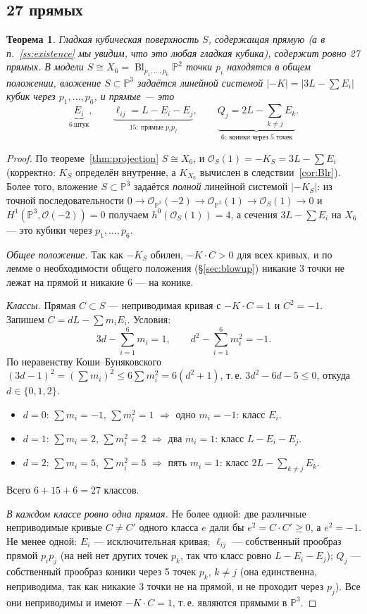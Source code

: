 \documentclass[11pt,a4paper]{article}
\theoremstyle{plain}
\newtheorem{theorem}{Теорема}[section]
\theoremstyle{definition}
\theoremstyle{remark}
\newcommand{\PP}{\mathbb{P}}
\newcommand{\cO}{\mathcal{O}}
\DeclareMathOperator{\Bl}{Bl}
\begin{document}
\subsection{27 прямых}

\begin{theorem}\label{thm:27}
Гладкая кубическая поверхность $S$, содержащая прямую (а в п.~\ref{ss:existence} мы увидим, что это любая гладкая
кубика), содержит ровно 27 прямых. В модели $S\cong X_6=\Bl_{p_1,\dots,p_6}\PP^2$ точки $p_i$ находятся в общем
положении, вложение $S\subset\PP^3$ задаётся линейной системой $|-K|=|3L-\sum E_i|$ кубик через $p_1,\dots,p_6$, и
прямые --- это
\[
\underbrace{E_i}_{6\ \text{штук}},\qquad
\underbrace{\ell_{ij}=L-E_i-E_j}_{15:\ \text{прямые } p_ip_j},\qquad
\underbrace{Q_j=2L-\textstyle\sum_{k\ne j}E_k}_{6:\ \text{коники через 5 точек}}.
\]
\end{theorem}
\begin{proof}
По теореме~\ref{thm:projection} $S\cong X_6$, и $\cO_S(1)=-K_S=3L-\sum E_i$ (корректно: $K_S$ определён
внутренне, а $K_{X_6}$ вычислен в следствии~\ref{cor:Blr}). Более того, вложение $S\subset\PP^3$ задаётся
\emph{полной} линейной системой $|-K_S|$: из точной последовательности $0\to\cO_{\PP^3}(-2)\to\cO_{\PP^3}(1)\to
\cO_S(1)\to0$ и $H^1(\PP^3,\cO(-2))=0$ получаем $h^0(\cO_S(1))=4$, а сечения $3L-\sum E_i$ на $X_6$ --- это
кубики через $p_1,\dots,p_6$.

\emph{Общее положение.} Так как $-K_S$ обилен, $-K\cdot C>0$ для всех кривых, и по лемме о необходимости общего
положения (\S\ref{sec:blowup}) никакие 3 точки не лежат на прямой и никакие 6 --- на конике.

\emph{Классы.} Прямая $C\subset S$ --- неприводимая кривая с $-K\cdot C=1$ и $C^2=-1$. Запишем
$C=dL-\sum m_iE_i$. Условия:
\[
3d-\sum_{i=1}^6m_i=1,\qquad d^2-\sum_{i=1}^6m_i^2=-1.
\]
По неравенству Коши--Буняковского $(3d-1)^2=(\sum m_i)^2\le6\sum m_i^2=6(d^2+1)$, т.\,е. $3d^2-6d-5\le0$,
откуда $d\in\{0,1,2\}$.
\begin{itemize}
\item $d=0$: $\sum m_i=-1$, $\sum m_i^2=1$ $\Rightarrow$ одно $m_i=-1$: класс $E_i$.
\item $d=1$: $\sum m_i=2$, $\sum m_i^2=2$ $\Rightarrow$ два $m_i=1$: класс $L-E_i-E_j$.
\item $d=2$: $\sum m_i=5$, $\sum m_i^2=5$ $\Rightarrow$ пять $m_i=1$: класс $2L-\sum_{k\ne j}E_k$.
\end{itemize}
Всего $6+15+6=27$ классов.

\emph{В каждом классе ровно одна прямая.} Не более одной: две различные неприводимые кривые $C\ne C'$ одного класса
$e$ дали бы $e^2=C\cdot C'\ge0$, а $e^2=-1$. Не менее одной: $E_i$ --- исключительная кривая; $\ell_{ij}$ ---
собственный прообраз прямой $p_ip_j$ (на ней нет других точек $p_k$, так что класс ровно $L-E_i-E_j$); $Q_j$ ---
собственный прообраз коники через 5 точек $p_k$, $k\ne j$ (она единственна, неприводима, так как никакие 3 точки
не на прямой, и не проходит через $p_j$). Все они неприводимы и имеют $-K\cdot C=1$, т.\,е. являются прямыми в
$\PP^3$.
\end{proof}
\end{document}
